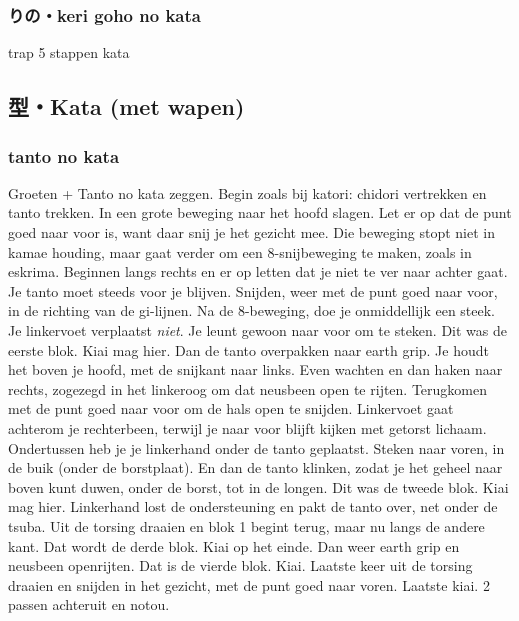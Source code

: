\subsubsection{りの・keri goho no kata}
trap 5 stappen kata

\subsection{型・Kata (met wapen)}

\subsubsection{tanto no kata}
Groeten + Tanto no kata zeggen.
Begin zoals bij katori: chidori vertrekken en tanto trekken.
In een grote beweging naar het hoofd slagen. Let er op dat de punt goed naar voor is,
want daar snij je het gezicht mee.
Die beweging stopt niet in kamae houding, maar gaat verder om een 8-snijbeweging te maken, zoals in eskrima.
Beginnen langs rechts en er op letten dat je niet te ver naar achter gaat. Je tanto moet steeds voor je blijven.
Snijden, weer met de punt goed naar voor, in de richting van de gi-lijnen.
Na de 8-beweging, doe je onmiddellijk een steek. Je linkervoet verplaatst \textit{niet}. Je leunt gewoon naar voor om te steken.
Dit was de eerste blok. Kiai mag hier.
Dan de tanto overpakken naar earth grip. Je houdt het boven je hoofd, met de snijkant naar links.
Even wachten en dan haken naar rechts, zogezegd in het linkeroog om dat neusbeen open te rijten. Terugkomen met de punt goed naar voor om de hals open te snijden. Linkervoet gaat achterom je rechterbeen, terwijl je naar voor blijft kijken met getorst lichaam. Ondertussen heb je je linkerhand onder de tanto geplaatst. Steken naar voren, in de buik (onder de borstplaat). En dan de tanto klinken, zodat je het geheel naar boven kunt duwen, onder de borst, tot in de longen.
Dit was de tweede blok. Kiai mag hier.
Linkerhand lost de ondersteuning en pakt de tanto over, net onder de tsuba. Uit de torsing draaien en blok 1 begint terug, maar nu langs de andere kant.
Dat wordt de derde blok. Kiai op het einde.
Dan weer earth grip en neusbeen openrijten. Dat is de vierde blok. Kiai.
Laatste keer uit de torsing draaien en snijden in het gezicht, met de punt goed naar voren. Laatste kiai.
2 passen achteruit en notou.

